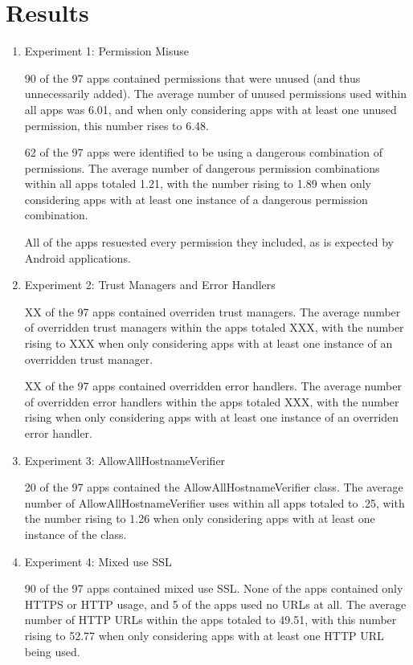 \section{Results}
\label{sec:discussion}

\begin{enumerate}
    \item Experiment 1: Permission Misuse
    
    90 of the 97 apps contained permissions that were 
    unused (and thus unnecessarily added). The average number 
    of unused permissions used within all apps was 6.01, 
    and when only considering apps with at least one 
    unused permission, this number rises to 6.48.

    62 of the 97 apps were identified to be using a dangerous
    combination of permissions. The average number of dangerous permission
    combinations within all apps totaled 1.21, with the number
    rising to 1.89 when only considering apps with at least one
    instance of a dangerous permission combination.

    All of the apps resuested every permission they included, as is expected by Android applications. 

    \item Experiment 2: Trust Managers and Error Handlers
    
    XX of the 97 apps contained overriden trust managers.
    The average number of overridden trust managers within the 
    apps totaled XXX, with the number rising to XXX when only 
    considering apps with at least one instance of an overridden trust 
    manager.

    XX of the 97 apps contained overridden error handlers.
    The average number of overridden error handlers within the apps
    totaled XXX, with the number rising when only considering apps
    with at least one instance of an overriden error handler.

    \item Experiment 3: AllowAllHostnameVerifier
    
    20 of the 97 apps contained the AllowAllHostnameVerifier class. 
    The average number of AllowAllHostnameVerifier uses within all
    apps totaled to .25, with the number rising to 1.26 when only
    considering apps with at least one instance of the class.

    \item Experiment 4: Mixed use SSL
    
    90 of the 97 apps contained mixed use SSL. None of the apps 
    contained only HTTPS or HTTP usage, and 5 of the apps used no 
    URLs at all. The average number of HTTP URLs within the apps 
    totaled to 49.51, with this number rising to 52.77 when only 
    considering apps with at least one HTTP URL being used.


\end{enumerate}
